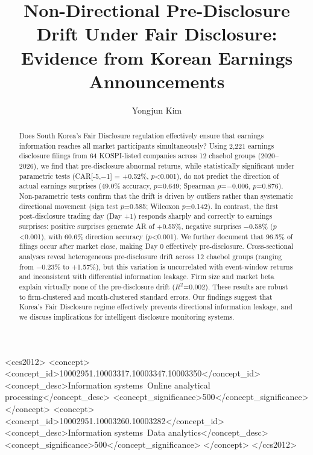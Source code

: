 \documentclass[manuscript,review]{acmart}
\begin{document}
\title{Non-Directional Pre-Disclosure Drift Under Fair Disclosure: Evidence from Korean Earnings Announcements}

\author{Yongjun Kim}

\begin{abstract}
Does South Korea's Fair Disclosure regulation effectively ensure that earnings information reaches all market participants simultaneously? Using 2,221 earnings disclosure filings from 64 KOSPI-listed companies across 12 chaebol groups (2020--2026), we find that pre-disclosure abnormal returns, while statistically significant under parametric tests (CAR[-5,$-$1] = +0.52\%, $p$<0.001), do not predict the direction of actual earnings surprises (49.0\% accuracy, $p$=0.649; Spearman $\rho$=$-$0.006, $p$=0.876). Non-parametric tests confirm that the drift is driven by outliers rather than systematic directional movement (sign test $p$=0.585; Wilcoxon $p$=0.142). In contrast, the first post-disclosure trading day (Day +1) responds sharply and correctly to earnings surprises: positive surprises generate AR of +0.55\%, negative surprises $-$0.58\% ($p$<0.001), with 60.6\% direction accuracy ($p$<0.001). We further document that 96.5\% of filings occur after market close, making Day 0 effectively pre-disclosure. Cross-sectional analyses reveal heterogeneous pre-disclosure drift across 12 chaebol groups (ranging from $-$0.23\% to +1.57\%), but this variation is uncorrelated with event-window returns and inconsistent with differential information leakage. Firm size and market beta explain virtually none of the pre-disclosure drift ($R^2$=0.002). These results are robust to firm-clustered and month-clustered standard errors. Our findings suggest that Korea's Fair Disclosure regime effectively prevents directional information leakage, and we discuss implications for intelligent disclosure monitoring systems.
\end{abstract}

\begin{CCSXML}
<ccs2012>
<concept>
<concept_id>10002951.10003317.10003347.10003350</concept_id>
<concept_desc>Information systems~Online analytical processing</concept_desc>
<concept_significance>500</concept_significance>
</concept>
<concept>
<concept_id>10002951.10003260.10003282</concept_id>
<concept_desc>Information systems~Data analytics</concept_desc>
<concept_significance>500</concept_significance>
</concept>
</ccs2012>
\end{CCSXML}
\end{document}
